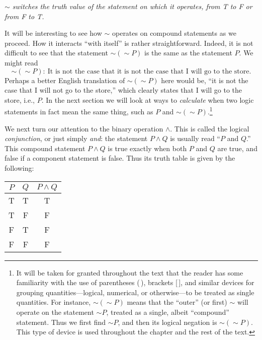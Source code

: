 \begin{center}{\sl
$\sim$ switches the truth value of the statement on which it operates,
from {\rm T} to {\rm F} or from {\rm F} to {\rm T}.
}
\end{center}

It will be interesting to see how $\sim$ operates on compound
statements as we proceed.
How it interacts ``with itself'' is rather 
straightforward.  Indeed, it is not difficult to see
that the statement $\sim(\sim P)$ is the same as the 
statement $P$.  We might read
$$\sim(\sim P):\ \text{It is not the case that it is not 
the case that I will go to the store.}$$
Perhaps a better English translation of  $\sim(\sim P)$ here
would be, ``it is not the case that I will not go to the store,''
which clearly states that I will go to the store, i.e., $P$.
In the next section we will look at ways to {\it calculate} when
two logic statements in fact mean the same thing, such
as $P$ and $\sim(\sim P)$.\footnote{%
It will be taken for granted throughout the text that the reader
has some familiarity with the use of parentheses (\,), 
brackets [\,], and similar devices for grouping quantities---logical,
numerical, or otherwise---to be treated as single quantities.
For instance, $\sim(\sim P)$ means that the ``outer'' (or first)
$\sim$ will operate  on the statement $\sim P$, treated as a single,
albeit ``compound'' statement.  Thus we first find $\sim P$, and then
its logical negation is $\sim(\sim P)$.  This type of device is
used throughout the chapter and the rest of the text.%
}





We next turn our attention to the binary operation
$\wedge$.  This is called the logical {\it conjunction}, or just
simply {\it and}:  the statement $P\wedge Q$ is usually
read ``$P$ and $Q$.''  This compound statement $P\wedge Q$ is
true exactly when both $P$ and $Q$ are true, and false if a
component statement is false.  Thus its truth table is
given by the following:
\medskip

\begin{center}
\begin{tabular}{|c|c||c|}\hline
$P$& $Q$& $P\wedge Q$\\
\hline
T&T&T\\
T&F&F\\
F&T&F\\
F&F&F\\\hline \end{tabular}
\end{center}
\medskip

